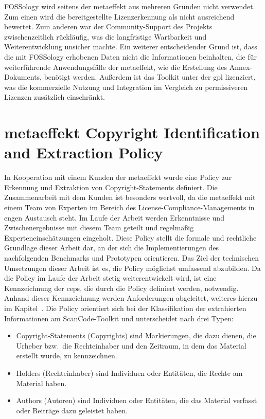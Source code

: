 FOSSology wird seitens der metaeffekt aus mehreren Gründen nicht verwendet.
Zum einen wird die bereitgestellte Lizenzerkennung als nicht ausreichend bewertet.
Zum anderen war der Community-Support des Projekts zwischenzeitlich rückläufig, was die langfristige Wartbarkeit und Weiterentwicklung unsicher machte.
Ein weiterer entscheidender Grund ist, dass die mit FOSSology erhobenen Daten nicht die Informationen beinhalten, die für weiterführende Anwendungsfälle der metaeffekt, wie die Erstellung des Annex-Dokuments, benötigt werden.
Außerdem ist das Toolkit unter der \gls{gpl} lizenziert, was die kommerzielle Nutzung und Integration im Vergleich zu permissiveren Lizenzen zusätzlich einschränkt.


\section{metaeffekt Copyright Identification and Extraction Policy}\label{sec:policy}

In Kooperation mit einem Kunden der metaeffekt wurde eine Policy zur Erkennung und Extraktion von Copyright-Statements definiert.
Die Zusammenarbeit mit dem Kunden ist besonders wertvoll, da die metaeffekt mit einem Team von Experten im Bereich des License-Compliance-Managements in engen Austausch steht.
Im Laufe der Arbeit werden Erkenntnisse und Zwischenergebnisse mit diesem Team geteilt und regelmäßig Experteneinschätzungen eingeholt.
Diese Policy stellt die formale und rechtliche Grundlage dieser Arbeit dar, an der sich die Implementierungen des nachfolgenden Benchmarks und Prototypen orientieren.
Das Ziel der technischen Umsetzungen dieser Arbeit ist es, die Policy möglichst umfassend abzubilden.
Da die Policy im Laufe der Arbeit stetig weiterentwickelt wird, ist eine Kennzeichnung der \glspl{cep}, die durch die Policy definiert werden, notwendig.
Anhand dieser Kennzeichnung werden Anforderungen abgeleitet, weiteres hierzu im Kapitel~.
Die Policy orientiert sich bei der Klassifikation der extrahierten Informationen am ScanCode-Toolkit und unterscheidet nach drei Typen:
\begin{itemize}
    \item Copyright-Statements (Copyrights) sind Markierungen, die dazu dienen, die Urheber bzw.\ die Rechteinhaber und den Zeitraum, in dem das Material erstellt wurde, zu kennzeichnen.
    \item Holders (Rechteinhaber) sind Individuen oder Entitäten, die Rechte am Material haben.
    \item Authors (Autoren) sind Individuen oder Entitäten, die das Material verfasst oder Beiträge dazu geleistet haben.
\end{itemize}

